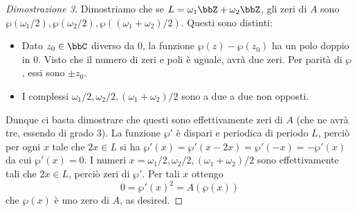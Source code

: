 \begin{proof}[Dimostrazione 3]
Dimostriamo che se $L=\omega_1\bbZ + \omega_2 \bbZ$, gli zeri di $A$ sono $ \wp(\omega_1/2), \wp(\omega_2/2), \wp((\omega_1+\omega_2)/2)$. Questi sono distinti:
\begin{itemize}
\item Dato $z_0 \in \bbC$ diverso da 0, la funzione $\wp(z) - \wp(z_0)$ ha un polo doppio in 0. Visto che il numero di zeri e poli è uguale, avrà due zeri. Per parità di $\wp$, essi sono $\pm z_0$.
\item I complessi $\omega_1/2, \omega_2/2, (\omega_1+\omega_2)/2$ sono a due a due non opposti.
\end{itemize}
Dunque ci basta dimostrare che questi sono effettivamente zeri di $A$ (che ne avrà tre, essendo di grado 3). La funzione $\wp'$ è dispari e periodica di periodo $L$, perciò per ogni $x$ tale che $2x \in L$ si ha
$\wp'(x) = \wp'(x-2x) = \wp'(-x) = -\wp'(x)$
da cui $\wp'(x) = 0$. I numeri $x=\omega_1/2, \omega_2/2, (\omega_1+\omega_2)/2$ sono effettivamente tali che $2x \in L$, perciò zeri di $\wp'$. Per tali $x$ ottengo
$$ 0 = \wp'(x)^2 = A(\wp(x))$$
che $\wp(x)$ è uno zero di $A$, as desired.
\end{proof}

